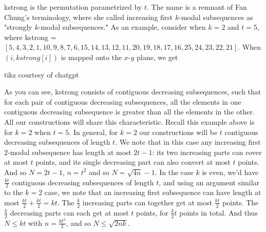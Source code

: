 \documentclass{article}
\begin{document}
kstrong is the permutation parametrized by $t$. The name is a remnant of Fan Chung's terminology, where she called increasing first $k$-modal subsequences as "strongly $k$-modal subsequences." As an example, consider when $k = 2$ and $t = 5$, where kstrong = $[5, 4, 3, 2, 1, 10, 9, 8, 7, 6, 15, 14, 13, 12, 11, 20, 19, 18, 17, 16, 25, 24, 23, 22, 21]$. When $(i, kstrong[i])$ is mapped onto the $x$-$y$ plane, we get \\


\begin{center}
\small tikz courtesy of chatgpt
\end{center}

As you can see, kstrong consists of contiguous decreasing subsequences, such that for each pair of contiguous decreasing subsequences, all the elements in one contiguous decreasing subsequence is greater than all the elements in the other. All our constructions will share this characteristic. Recall this example above is for $k = 2$ when $t = 5$. In general, for $k = 2$ our constructions will be $t$ contiguous decreasing subsequences of length $t$. We note that in this case any increasing first $2$-modal subsequence has length at most $2t-1$: its two increasing parts can cover at most $t$ points, and its single decreasing part can also convert at most $t$ points. And so $N = 2t - 1$, $n = t^2$ and so $N = \sqrt{4n} - 1$. In the case $k$ is even, we'd have $\frac{kt}{2}$ contiguous decreasing subsequences of length $t$, and using an argument similar to the $k = 2$ case, we note that an increasing first subsequence can have length at most $\frac{kt}{2} + \frac{kt}{2} = kt$. The $\frac{k}{2}$ increasing parts can together get at most $\frac{kt}{2}$ points. The $\frac{k}{2}$ decreasing parts can each get at most $t$ points, for $\frac{k}{2}t$ points in total. And thus $N \leq kt$ with $n = \frac{kt^2}{2}$, and so $N \leq \sqrt{2nk}$. \\
\end{document}
